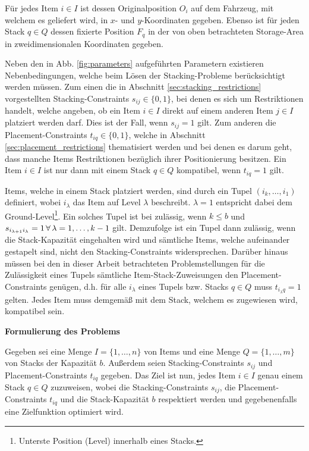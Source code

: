 \vfill
\pagebreak

Für jedes Item $i \in I$ ist dessen Originalposition $O_i$ auf dem Fahrzeug, mit welchem es geliefert wird,
in $x$- und $y$-Koordinaten gegeben. Ebenso ist für jeden Stack $q \in Q$ dessen fixierte Position $F_q$ in der von oben betrachteten Storage-Area in zweidimensionalen Koordinaten gegeben.

Neben den in Abb. \ref{fig:parameters} aufgeführten Parametern existieren Nebenbedingungen, welche beim Lösen der Stacking-Probleme
berücksichtigt werden müssen. Zum einen die in Abschnitt \ref{sec:stacking_restrictions} vorgestellten Stacking-Constraints
$s_{ij} \in \{0, 1\}$, bei denen es sich um Restriktionen handelt, welche angeben, ob ein Item $i \in I$ direkt auf einem anderen Item $j \in I$ platziert werden darf. Dies ist der Fall, wenn $s_{ij} = 1$ gilt.
Zum anderen die Placement-Constraints $t_{iq} \in \{0, 1\}$, welche in Abschnitt \ref{sec:placement_restrictions} thematisiert werden und bei denen es darum geht, dass manche Items Restriktionen bezüglich ihrer Positionierung besitzen. Ein Item $i \in I$ ist nur dann mit einem Stack $q \in Q$ kompatibel, wenn $t_{iq} = 1$ gilt.

Items, welche in einem Stack platziert werden, sind durch ein Tupel $(i_k, \dotsc, i_1)$ definiert, wobei
$i_\lambda$ das Item auf Level $\lambda$ beschreibt. $\lambda = 1$ entspricht dabei dem
Ground-Level\footnote{Unterste Position (Level) innerhalb eines Stacks.}.
Ein solches Tupel ist bei \citet{Bruns2015} zulässig, wenn $k \leq b$ und $s_{i_{\lambda + 1} i_\lambda} = 1
\thinspace \forall \thinspace \lambda = 1, \dotsc, k - 1$ gilt.
Demzufolge ist ein Tupel dann zulässig, wenn die Stack-Kapazität eingehalten wird und sämtliche Items,
welche aufeinander gestapelt sind, nicht den Stacking-Constraints widersprechen. Darüber hinaus müssen bei den in dieser
Arbeit betrachteten Problemstellungen für die Zulässigkeit eines Tupels sämtliche Item-Stack-Zuweisungen
den Placement-Constraints genügen, d.h. für alle $i_\lambda$ eines Tupels bzw. Stacks $q \in Q$ muss
$t_{i_\lambda q} = 1$ gelten. Jedes Item muss demgemäß mit dem Stack, welchem es zugewiesen wird, kompatibel sein.
\newline

\textbf{Formulierung des Problems}

Gegeben sei eine Menge $I = \{1, \dotsc, n\}$ von Items und eine Menge $Q = \{1, \dotsc, m\}$ von Stacks der Kapazität $b$.
Außerdem seien Stacking-Constraints $s_{ij}$ und Placement-Constraints $t_{iq}$ gegeben.
Das Ziel ist nun, jedes Item $i \in I$ genau einem Stack $q \in Q$ zuzuweisen, wobei die Stacking-Constraints $s_{ij}$,
die Placement-Constraints $t_{iq}$ und die Stack-Kapazität $b$ respektiert werden und gegebenenfalls eine Zielfunktion
optimiert wird.

